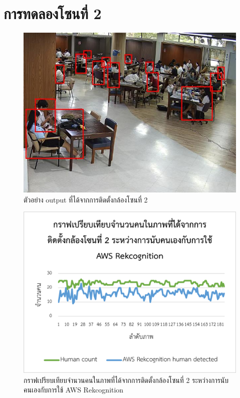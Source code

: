 \section{การทดลองโซนที่ 2}
\begin{figure}[ht]
    \centering
    \includegraphics[scale=0.5]{images/modified_Picture (102).jpg}
    \caption[output2]{ตัวอย่าง output ที่ได้จากการติดตั้งกล้องโซนที่ 2}
    \label{fig:output2}
\end{figure}
\begin{figure}[ht]
    \centering
    \includegraphics[scale=1]{images/graph1_zone2.png}
    \caption[graph1-2]{กราฟเปรียบเทียบจำนวนคนในภาพที่ได้จากการติดตั้งกล้องโซนที่ 2 ระหว่างการนับคนเองกับการใช้ AWS Rekcognition}
    \label{fig:graph1-2}
\end{figure}
